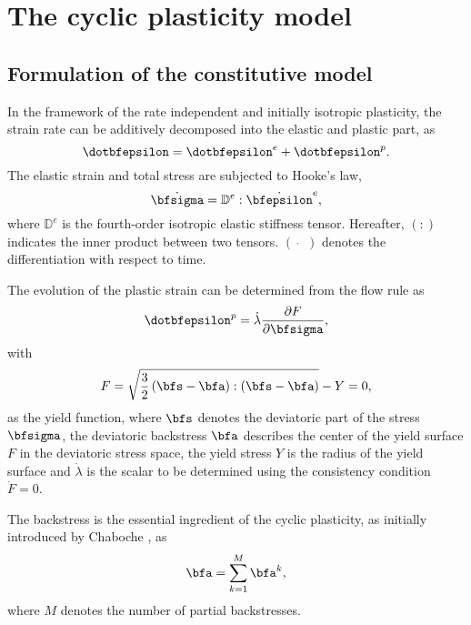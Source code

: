 \section{The cyclic plasticity model}

\subsection{Formulation of the constitutive model}
\noindent
In the framework of the rate independent and initially isotropic plasticity, the strain rate can be additively decomposed into the elastic and plastic  part, as
\begin{equation}
\dotbfepsilon = {\dotbfepsilon}^e + {\dotbfepsilon}^p.
\end{equation}
The elastic strain and total stress are subjected to Hooke's law,
\begin{equation}
{\dot\bfsigma} = {\mathbb{D}^e}:{\dot\bfepsilon^e},
\label{Equ:HookesLaw}
\end{equation}
where ${\mathbb{D}^e}$ is the fourth-order isotropic elastic stiffness tensor. Hereafter, $(:)$ indicates the inner product between two tensors. $(\dot{\quad})$ denotes the differentiation with respect to time.

The evolution of the plastic strain can be determined from the flow rule as
\begin{equation}
{\dotbfepsilon}^p = \dot \lambda \frac{{\partial F}}{{\partial {\bfsigma}}},
\end{equation}
with
\begin{equation}
F = \sqrt {\frac{3}{2}\left( {\bfs - \bfa} \right):\left( {\bfs - \bfa} \right)}  - Y=0,
\end{equation}
as the yield function, where $\bfs$ denotes the deviatoric part of the stress ${\bfsigma}$, the deviatoric backstress $\bfa$ describes the center of the yield surface $F$ in the deviatoric stress space, the yield stress $Y$ is the radius of the yield surface and $\dot \lambda$ is the scalar to be determined using the consistency condition $\dot F = 0$.

The backstress is the essential ingredient of the cyclic plasticity, as initially introduced by Chaboche \cite{Chaboche1986149}, as
\begin{equation}
\bfa = \sum\limits_{k = 1}^M {{\bfa^k}},
\end{equation}
where $M$ denotes the number of partial backstresses.

